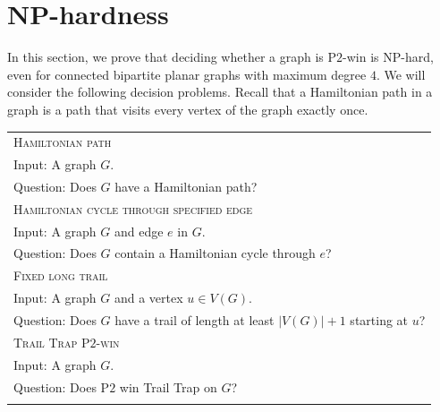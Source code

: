 \documentclass{article}
\theoremstyle{plain}
\theoremstyle{definition}
\def\ptwo{{\rm{P}\ensuremath{2}}}
\begin{document}
\section{NP-hardness} \label{sec NP-hardness}

In this section, we prove that deciding whether a graph is \ptwo{}-win is NP-hard, even for connected bipartite planar graphs with maximum degree $4$.
We will consider the following decision problems. Recall that a Hamiltonian path in a graph is a path that visits every vertex of the graph exactly once.

\medskip
	\begin{tabular}{l}
		\textsc{Hamiltonian path}\\
		Input: A graph $G$.\\ \vspace{0.5cm}
		Question: Does $G$ have a Hamiltonian path?\\
        

        \textsc{Hamiltonian cycle through specified edge}\\
            Input: A graph $G$ and edge $e$ in $G$.\\ \vspace{0.5cm}
            Question: Does $G$ contain a Hamiltonian cycle through $e$?\\

        \textsc{Fixed long trail}\\
		Input: A graph $G$ and a vertex $u \in V(G)$.\\ \vspace{0.5cm}
		Question: Does $G$ have a trail of length at least $|V(G)| + 1$ starting at $u$?\\

        \textsc{Trail Trap \ptwo{}-win}\\
		Input: A graph $G$.\\
		Question: Does \ptwo{} win {\sc Trail Trap} on $G$?\\

        \medskip

	\end{tabular}
\end{document}
